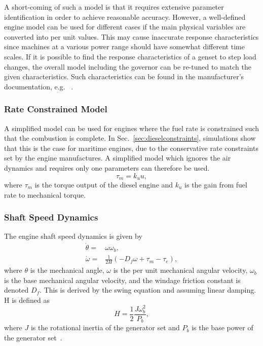 \documentclass[journal]{IEEEtran}
\begin{document}
A short-coming of such a model is that it requires extensive parameter identification in order to achieve reasonable accuracy. However, a well-defined engine model can be used for different cases if the main physical variables are converted into per unit values. This may cause inaccurate response characteristics since machines at a various power range should have somewhat different time scales. If it is possible to find the response characteristics of a genset to step load changes, the overall model including the governor can be re-tuned to match the given characteristics. Such characteristics can be found in the manufacturer's documentation, e.g. ~\cite{MANEnginesandSystems2013}.

\subsubsection{Rate Constrained Model}
A simplified model can be used for engines where the fuel rate is constrained such that the combustion is complete.
In Sec.~\ref{sec:dieselconstraints}, simulations show that this is the case for maritime engines, due to the conservative rate constraints set by the engine manufactures.
A simplified model which ignores the air dynamics and requires only one parameters can therefore be used.
\begin{equation}
\tau_m = k_u u, 
\end{equation}
where $\tau_m$ is the torque output of the diesel engine and $k_u$ is the gain from fuel rate to mechanical torque.

\subsubsection{Shaft Speed Dynamics}
The engine shaft speed dynamics is given by
\begin{align}
\dot{\theta} =& \omega \omega_b,\\
\dot{\omega} =& \frac{1}{2H} \left(-D_f \omega + \tau_m  - \tau_e \right),
\end{align}
where $\theta$ is the mechanical angle, $\omega$ is the per unit mechanical angular velocity, $\omega_b$ is the base mechanical angular velocity, and the windage friction constant is denoted $D_f$.
This is derived by the swing equation and assuming linear damping.
H is defined as
\begin{equation}
H = \dfrac{1}{2}\dfrac{J \omega_b^2}{P_b},
\end{equation}
where $J$ is the rotational inertia of the generator set and $P_b$ is the base power of the generator set~\cite{Krause2013}.
\end{document}
